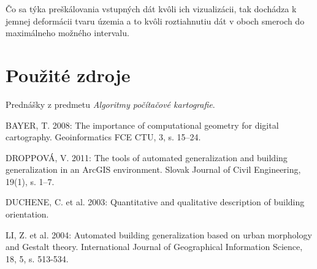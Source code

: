 \documentclass[11pt]{article}
\begin{document}
\noindent Čo sa týka preškálovania vstupných dát kvôli ich vizualizácii, tak dochádza k jemnej deformácii tvaru územia a to kvôli roztiahnutiu dát v oboch smeroch do maximálneho možného intervalu.

\newpage
\setlength{\parindent}{0cm}
\section{Použité zdroje}
Prednášky z predmetu \textit{Algoritmy počítačové kartografie}.

BAYER, T. 2008: The importance of computational geometry for digital cartography. Geoinformatics FCE CTU, 3, s. 15–24.

DROPPOVÁ, V. 2011: The tools of automated generalization and building generalization in an ArcGIS environment. Slovak Journal of Civil Engineering, 19(1), s. 1–7.

DUCHENE, C. et al. 2003: Quantitative and qualitative description of building orientation.

LI, Z. et al. 2004: Automated building generalization based on urban morphology and Gestalt theory. International Journal of Geographical Information Science, 18, 5, s. 513-534.
\end{document}
